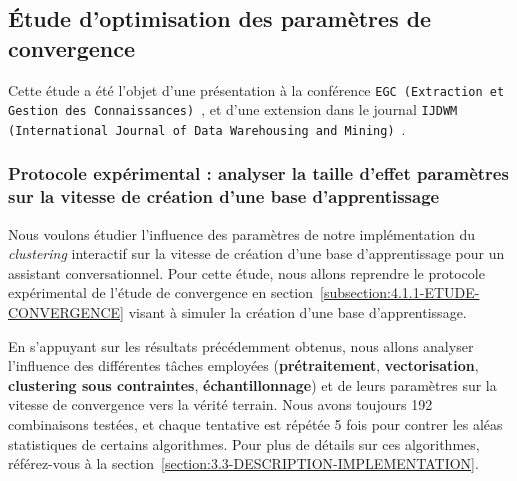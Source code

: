 		\subsection{Étude d'optimisation des paramètres de convergence}
		\label{subsection:4.2.1-ETUDE-OPTIMISATION}
				
			Cette étude a été l'objet d'une présentation à la conférence \texttt{EGC (Extraction et Gestion des Connaissances)}~\citep{schild:conception-interactive-clustering:2021}, et d'une extension dans le journal \texttt{IJDWM (International Journal of Data Warehousing and Mining)}~\citep{schild:extension-interactive-clustering:2022}.
	
			\subsubsection{Protocole expérimental : analyser la taille d'effet paramètres sur la vitesse de création d'une base d'apprentissage}

				Nous voulons étudier l'influence des paramètres de notre implémentation du \textit{clustering} interactif sur la vitesse de création d'une base d'apprentissage pour un assistant conversationnel.
				Pour cette étude, nous allons reprendre le protocole expérimental de l'étude de convergence en section~\ref{subsection:4.1.1-ETUDE-CONVERGENCE} visant à simuler la création d'une base d'apprentissage.
				
				En s'appuyant sur les résultats précédemment obtenus, nous allons analyser l'influence des différentes tâches employées (\textbf{prétraitement}, \textbf{vectorisation}, \textbf{clustering sous contraintes}, \textbf{échantillonnage}) et de leurs paramètres sur la vitesse de convergence vers la vérité terrain.
				Nous avons toujours 192 combinaisons testées, et chaque tentative est répétée 5 fois pour contrer les aléas statistiques de certains algorithmes.
				Pour plus de détails sur ces algorithmes, référez-vous à la section~\ref{section:3.3-DESCRIPTION-IMPLEMENTATION}.
				
